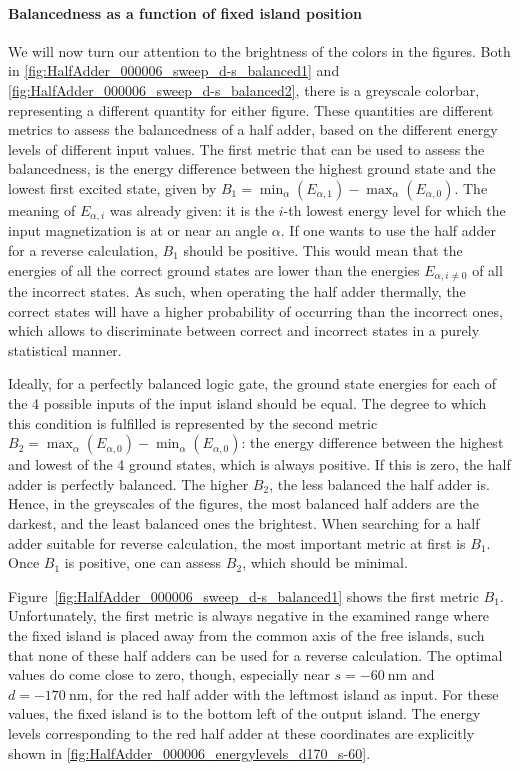\documentclass[11pt,a4paper,english,twoside]{article}
\begin{document}
\paragraph{Balancedness as a function of fixed island position}
We will now turn our attention to the brightness of the colors in the figures. Both in \cref{fig:HalfAdder_000006_sweep_d-s_balanced1} and \cref{fig:HalfAdder_000006_sweep_d-s_balanced2}, there is a greyscale colorbar, representing a different quantity for either figure. These quantities are different metrics to assess the balancedness of a half adder, based on the different energy levels of different input values. The first metric that can be used to assess the balancedness, is the energy difference between the highest ground state and the lowest first excited state, given by $B_1 = \min_\alpha(E_{\alpha,1}) - \max_\alpha(E_{\alpha,0})$. The meaning of $E_{\alpha,i}$ was already given: it is the $i$-th lowest energy level for which the input magnetization is at or near an angle $\alpha$. If one wants to use the half adder for a reverse calculation, $B_1$ should be positive. This would mean that the energies of all the correct ground states are lower than the energies $E_{\alpha,i\neq 0}$ of all the incorrect states. As such, when operating the half adder thermally, the correct states will have a higher probability of occurring than the incorrect ones, which allows to discriminate between correct and incorrect states in a purely statistical manner. \par
Ideally, for a perfectly balanced logic gate, the ground state energies for each of the 4 possible inputs of the input island should be equal. The degree to which this condition is fulfilled is represented by the second metric $B_2 = \max_\alpha(E_{\alpha,0}) - \min_\alpha(E_{\alpha,0})$: the energy difference between the highest and lowest of the 4 ground states, which is always positive. If this is zero, the half adder is perfectly balanced. The higher $B_2$, the less balanced the half adder is.
Hence, in the greyscales of the figures, the most balanced half adders are the darkest, and the least balanced ones the brightest. When searching for a half adder suitable for reverse calculation, the most important metric at first is $B_1$. Once $B_1$ is positive, one can assess $B_2$, which should be minimal. \par
Figure~\ref{fig:HalfAdder_000006_sweep_d-s_balanced1} shows the first metric $B_1$. Unfortunately, the first metric is always negative in the examined range where the fixed island is placed away from the common axis of the free islands, such that none of these half adders can be used for a reverse calculation. The optimal values do come close to zero, though, especially near $s=\SI{-60}{\nano\metre}$ and $d=\SI{-170}{\nano\metre}$, for the red half adder with the leftmost island as input. For these values, the fixed island is to the bottom left of the output island. The energy levels corresponding to the red half adder at these coordinates are explicitly shown in \cref{fig:HalfAdder_000006_energylevels_d170_s-60}.
\end{document}
